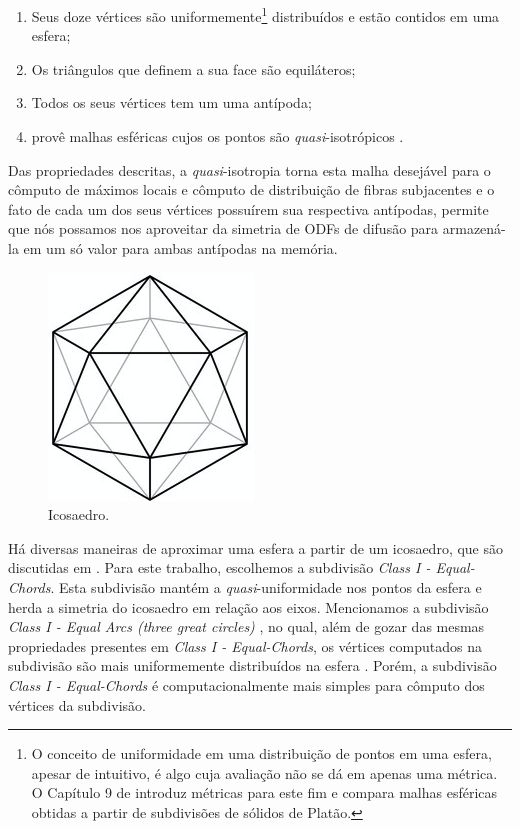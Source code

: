 \documentclass[
    12pt,                %
    oneside,            %
    a4paper,            %
    english,            %
    french,                %
    spanish,            %
    brazil                %
    ]{abntex2}
\begin{document}
\begin{enumerate}
    \item Seus doze vértices são uniformemente\footnote{O conceito de uniformidade em uma distribuição de pontos em uma esfera, apesar de intuitivo, é algo cuja avaliação não se dá em apenas uma métrica. O Capítulo 9 de \cite{popko2012} introduz métricas para este fim e compara malhas esféricas obtidas a partir de subdivisões de sólidos de Platão.} distribuídos e estão contidos em uma esfera;
    \item Os triângulos que definem a sua face são equiláteros;
    \item Todos os seus vértices tem um uma antípoda;
    \item provê malhas esféricas cujos os pontos são \textit{quasi}-isotrópicos \cite{popko2012}.
\end{enumerate}

Das propriedades descritas, a \textit{quasi}-isotropia torna esta malha desejável para o cômputo de máximos locais e cômputo de distribuição de fibras subjacentes \cite{descoteaux2007} e o fato de cada um dos seus vértices possuírem sua respectiva antípodas, permite que nós possamos nos aproveitar da simetria de ODFs de difusão para armazená-la em um só valor para ambas antípodas na memória.

\begin{figure}[ht]
    \centering
    \includegraphics[width=.3\linewidth, angle=0]{figs/HARDI/icosaedro.png}
    \caption{
    Icosaedro.
    }
    \label{fig::icosaedro}
   \hspace{1pt}
\end{figure}

Há diversas maneiras de aproximar uma esfera a partir de um icosaedro, que são discutidas em . Para este trabalho, escolhemos a subdivisão \textit{Class I - Equal-Chords}. Esta subdivisão mantém a \textit{quasi}-uniformidade nos pontos da esfera e herda a simetria do icosaedro em relação aos eixos. Mencionamos a subdivisão \textit{Class I - Equal Arcs (three great circles)} , no qual, além de gozar das mesmas propriedades presentes em  \textit{Class I - Equal-Chords}, os vértices computados na subdivisão são mais uniformemente distribuídos na esfera \cite{popko2012}. Porém, a subdivisão \textit{Class I - Equal-Chords} é computacionalmente mais simples para cômputo dos vértices da subdivisão.
\end{document}
